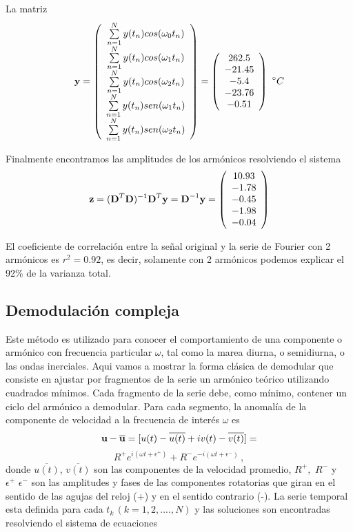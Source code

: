 \documentclass[
]{agujournal2019}
\begin{document}
La matriz \[{\textbf y}=\left( \begin{array}{ccc}
\sum\limits^N_{n=1}y(t_n)cos(\omega_0 t_n) \\
\sum\limits^N_{n=1}y(t_n)cos(\omega_1 t_n) \\
\sum\limits^N_{n=1}y(t_n)cos(\omega_2 t_n) \\
\sum\limits^N_{n=1}y(t_n)sen(\omega_1 t_n) \\
\sum\limits^N_{n=1}y(t_n)sen(\omega_2 t_n) \\
\end{array} \right)=
\left( \begin{array}{ccc}
262.5 \\
-21.45 \\
-5.4 \\
-23.76 \\
-0.51 \\
\end{array} \right)\,\,^\circ{C}\]

Finalmente encontramos las amplitudes de los armónicos resolviendo el
sistema
\[{\textbf z}=({\textbf D}^T{\textbf D})^{-1}{\textbf D}^{T}{\textbf y}={\textbf D}^{-1}{\textbf y}=\left( \begin{array}{ccc}
10.93\\
-1.78\\
-0.45\\
-1.98\\
-0.04
\end{array} \right)\]

El coeficiente de correlación entre la señal original y la serie de
Fourier con 2 armónicos es \(r^2=0.92\), es decir, solamente con 2
armónicos podemos explicar el 92\% de la varianza total.

\subsection{Demodulación compleja}\label{demodulaciuxf3n-compleja}

Este método es utilizado para conocer el comportamiento de una
componente o armónico con frecuencia particular \(\omega\), tal como la
marea diurna, o semidiurna, o las ondas inerciales. Aqui vamos a mostrar
la forma clásica de demodular que consiste en ajustar por fragmentos de
la serie un armónico teórico utilizando cuadrados mínimos. Cada
fragmento de la serie debe, como mínimo, contener un ciclo del armónico
a demodular. Para cada segmento, la anomalía de la componente de
velocidad a la frecuencia de interés \(\omega\) es
\[{\textbf u} - \overline{\textbf u}=[u(t)-\overline{u(t)} +iv(t)-\overline{v(t)}]=\]
\[R^+ e^{i(\omega t + \epsilon^+)} + R^- e^{-i(\omega t + \epsilon^-)}\,,\]
donde \(\overline{u(t)}\), \(\overline{v(t)}\) son las componentes de la
velocidad promedio, \(R^+,\,\,R^-\) y \(\epsilon^+\,\,\epsilon^-\) son
las amplitudes y fases de las componentes rotatorias que giran en el
sentido de las agujas del reloj (+) y en el sentido contrario (-). La
serie temporal esta definida para cada \(t_k\,(k=1,2,....,N)\) y las
soluciones son encontradas resolviendo el sistema de ecuaciones
\end{document}
